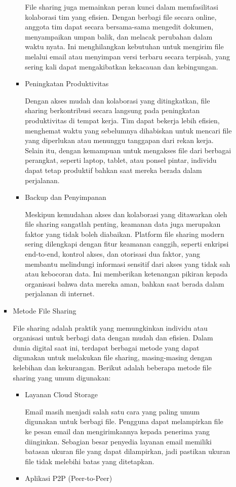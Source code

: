 \documentclass[12pt]{article}
\begin{document}
\begin{itemize}
\begin{enumerate}
\begin{itemize}
\begin{itemize}
                File sharing juga memainkan peran kunci dalam memfasilitasi kolaborasi tim yang efisien. Dengan berbagi file secara online, anggota tim dapat secara bersama-sama mengedit dokumen, menyampaikan umpan balik, dan melacak perubahan dalam waktu nyata. Ini menghilangkan kebutuhan untuk mengirim file melalui email atau menyimpan versi terbaru secara terpisah, yang sering kali dapat mengakibatkan kekacauan dan kebingungan.
               \item Peningkatan Produktivitas 

               Dengan akses mudah dan kolaborasi yang ditingkatkan, file sharing berkontribusi secara langsung pada peningkatan produktivitas di tempat kerja. Tim dapat bekerja lebih efisien, menghemat waktu yang sebelumnya dihabiskan untuk mencari file yang diperlukan atau menunggu tanggapan dari rekan kerja. Selain itu, dengan kemampuan untuk mengakses file dari berbagai perangkat, seperti laptop, tablet, atau ponsel pintar, individu dapat tetap produktif bahkan saat mereka berada dalam perjalanan.
               \item Backup dan Penyimpanan
               
               Meskipun kemudahan akses dan kolaborasi yang ditawarkan oleh file sharing sangatlah penting, keamanan data juga merupakan faktor yang tidak boleh diabaikan. Platform file sharing modern sering dilengkapi dengan fitur keamanan canggih, seperti enkripsi end-to-end, kontrol akses, dan otorisasi dua faktor, yang membantu melindungi informasi sensitif dari akses yang tidak sah atau kebocoran data. Ini memberikan ketenangan pikiran kepada organisasi bahwa data mereka aman, bahkan saat berada dalam perjalanan di internet.
               \vspace{2pt}
            \end{itemize}
            \item Metode File Sharing

            File sharing adalah praktik yang memungkinkan individu atau organisasi untuk berbagi data dengan mudah dan efisien. Dalam dunia digital saat ini, terdapat berbagai metode yang dapat digunakan untuk melakukan file sharing, masing-masing dengan kelebihan dan kekurangan. Berikut adalah beberapa metode file sharing yang umum digunakan:

            \begin{itemize}
                \item Layanan Cloud Storage

                Email masih menjadi salah satu cara yang paling umum digunakan untuk berbagi file. Pengguna dapat melampirkan file ke pesan email dan mengirimkannya kepada penerima yang diinginkan. Sebagian besar penyedia layanan email memiliki batasan ukuran file yang dapat dilampirkan, jadi pastikan ukuran file tidak melebihi batas yang ditetapkan.
                \item Aplikasi P2P (Peer-to-Peer)


\end{itemize}
\end{itemize}
\end{enumerate}
\end{itemize}
\end{document}
